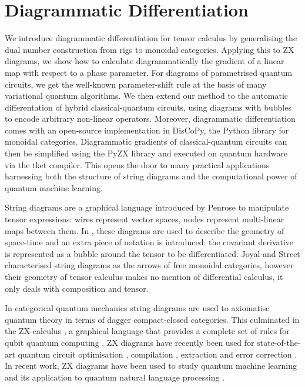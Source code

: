 
\section{Diagrammatic Differentiation}

We introduce diagrammatic differentiation for tensor calculus by generalising the
dual number construction from rigs to monoidal categories. Applying this to ZX
diagrams, we show how to calculate diagrammatically the gradient of a linear map
with respect to a phase parameter. For diagrams of parametrised quantum circuits,
we get the well-known parameter-shift rule at the basis of many variational
quantum algorithms. We then extend our method to the automatic
differentation of hybrid classical-quantum circuits, using diagrams with bubbles
to encode arbitrary non-linear operators. Moreover, diagrammatic differentiation
comes with an open-source implementation in DisCoPy, the Python library for
monoidal categories.
Diagrammatic gradients of classical-quantum circuits can then be simplified
using the PyZX library and executed on quantum hardware via the
tket compiler. This opens the door to many practical applications
harnessing both the structure of string diagrams and the computational power of
quantum machine learning.

String diagrams are a graphical language introduced by Penrose \cite{Penrose71}
to manipulate tensor expressions: wires represent vector spaces, nodes represent
multi-linear maps between them. In \cite{PenroseRindler84}, these diagrams are
used to describe the geometry of space-time and an extra piece of notation is
introduced: the covariant derivative is represented as a bubble around the tensor
to be differentiated. Joyal and Street \cite{JoyalStreet88,JoyalStreet91}
characterised string diagrams as the arrows of free monoidal categories, however
their geometry of tensor calculus makes no mention of differential calculus, it
only deals with composition and tensor.

In categorical quantum mechanics \cite{AbramskyCoecke08} string diagrams
are used to axiomatise quantum theory in terms of dagger compact-closed
categories. This culminated in the ZX-calculus \cite{CoeckeDuncan08},
a graphical language that provides a complete set of rules for qubit quantum
computing \cite{JeandelEtAl18a,HadzihasanovicEtAl18}. ZX diagrams
have recently been used for state-of-the-art quantum circuit optimisation
\cite{KissingerVanDeWetering20,DuncanEtAl20,DeBeaudrapEtAl20}, compilation
\cite{CowtanEtAl20,DeGriendDuncan20}, extraction \cite{BackensEtAl20} and error
correction \cite{ChancellorEtAl18,GidneyFowler19}. In recent work, ZX diagrams
have been used to study quantum machine learning \cite{Yeung20,ZhaoGao21} and
its application to quantum natural language processing
\cite{MeichanetzidisEtAl20a,CoeckeEtAl20}.

